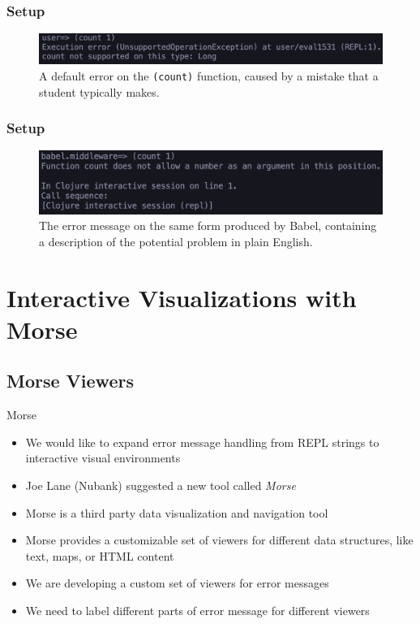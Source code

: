 \documentclass{beamer}
\begin{document}
\begin{frame}
    \frametitle{Setup}
    \begin{figure}
        \centering
        \includegraphics[width=\textwidth]{../resources/CountError.png}
        \caption{A default error on the \texttt{(count)} function, caused by a mistake that a student typically makes.}
        \label{fig:countError}
    \end{figure}
\end{frame}

\begin{frame}
    \frametitle{Setup}
    \begin{figure}
        \centering
        \includegraphics[width=\textwidth]{../resources/CountBabelError.png}
        \caption{The error message on the same form produced by Babel, containing a description of the potential problem in plain English.}
        \label{fig:BabelCountError}
    \end{figure}
\end{frame}

\section{Interactive Visualizations with Morse}

\subsection{Morse Viewers}

\begin{frame}{Morse}
  \begin{itemize}
    \item We would like to expand error message handling from REPL strings to interactive visual environments
    \item Joe Lane (Nubank) suggested a new tool called \textit{Morse} 
    \item Morse is a third party data visualization and navigation tool
    \item Morse provides a customizable set of viewers for different data structures, like text, maps, or HTML content
    \item We are developing a custom set of viewers for error messages
    \item We need to label different parts of error message for different viewers
  \end{itemize}
\end{frame}
\end{document}
